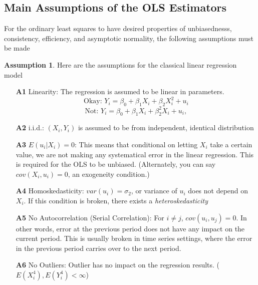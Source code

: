 \documentclass[12pt]{article}
\theoremstyle{definition}
\theoremstyle{property}
\theoremstyle{assumption}
\newtheorem{assumption}{Assumption}[section]
\theoremstyle{example}
\theoremstyle{comment}
\begin{document}
\subsection{Main Assumptions of the OLS Estimators}
For the ordinary least squares to have desired properties of unbiasednesss, consistency, efficiency, and asymptotic normality, the following assumptions must be made
\begin{mdframed}[backgroundcolor=blue!5] 
\begin{assumption} Here are the assumptions for the classical linear regression model
\begin{itemize}
\item[\textbf{A1}] Linearity: The regression is assumed to be linear in parameters.
\[
\text{Okay: } Y_i = \beta_0 + \beta_1X_i + \beta_2X_i^2+u_i 
\]
\[
\text{Not: } Y_i = \beta_0 + \beta_1X_i + \beta_2^2X_i+u_i,
\]
\item[\textbf{A2}] i.i.d.: $(X_i,Y_i)$ is assumed to be from independent, identical distribution
\item[\textbf{A3}] $E(u_i|X_i)=0$: This means that conditional on letting $X_i$ take a certain value, we are not making any systematical error in the linear regression. This is required for the OLS to be unbiased. (Alternately, you can say $cov(X_i,u_i)=0$, an exogeneity condition.)
\item[\textbf{A4}] Homoskedasticity: $var(u_i)=\sigma_2$, or variance of $u_i$ does not depend on $X_i$. If this condition is broken, there exists a \textit{heteroskedasticity}
\item[\textbf{A5}] No Autocorrelation (Serial Correlation): For $i\neq j$, $cov(u_i,u_j)=0$. In other words, error at the previous period does not have any impact on the current period. This is usually broken in time series settings, where the error in the previous period carries over to the next period.
\item[\textbf{A6}] No Outliers: Outlier has no impact on the regression results. ($E(X_i^4), E(Y_i^4)<\infty$)
\end{itemize}
\end{assumption}
\end{mdframed}
\end{document}
